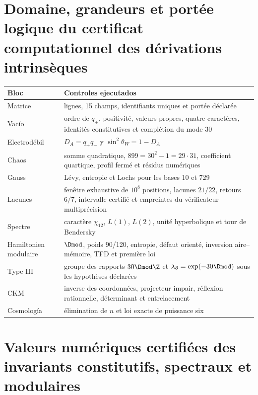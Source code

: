 \section{Domaine, grandeurs et portée logique du certificat computationnel des dérivations intrinsèques}

\begin{longtable}{@{}>{\raggedright\arraybackslash}p{}>{\raggedright\arraybackslash}p{}@{}}
\toprule
Bloc & Controles ejecutados\\
\midrule
\endhead
Matrice & 58 lignes, 15 champs, identifiants uniques et portée déclarée\\
Vac\'io & ordre de \(q_\pm\), positivité, valeurs propres, quatre caractères, identités constitutives et complétion du mode 30\\
Electrod\'ebil & \(D_A=q_+q_-\) y \(\sin^2\theta_W=1-D_A\)\\
Chaos & somme quadratique, \(899=30^2-1=29\cdot31\), coefficient quartique, profil fermé et résidus numériques\\
Gauss & Lévy, entropie et Lochs pour les bases 10 et 729\\
Lacunes & fenêtre exhaustive de \(10^8\) positions, lacunes \(21/22\), retours \(6/7\), intervalle certifié et empreintes du vérificateur multiprécision\\
Spectre & caractère \(\chi_{12}\), \(L(1)\), \(L(2)\), unité hyperbolique et tour de Bendersky\\
Hamiltonien modulaire & \(\Dmod\), poids 90/120, entropie, défaut orienté, inversion aire--mémoire, TFD et première loi\\
Type III & groupe des rapports \(30\Dmod\Z\) et \(\lambda_\partial=\exp(-30\Dmod)\) sous les hypothèses déclarées\\
CKM & inverse des coordonnées, projecteur impair, réflexion rationnelle, déterminant et entrelacement\\
Cosmolog\'ia & élimination de \(n\) et loi exacte de puissance six\\
\bottomrule
\end{longtable}

\section{Valeurs numériques certifiées des invariants constitutifs, spectraux et modulaires}


